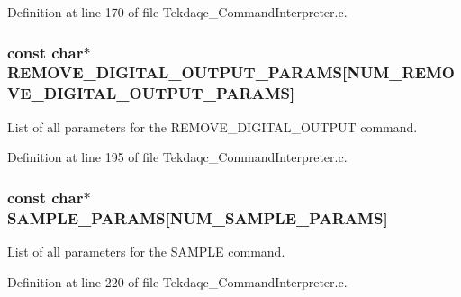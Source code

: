 Definition at line 170 of file Tekdaqc\-\_\-\-Command\-Interpreter.\-c.

\hypertarget{group__command__interpreter_gab8e88e0e75930f03474e1ff9e232ef63}{
\subsubsection[{R\-E\-M\-O\-V\-E\-\_\-\-D\-I\-G\-I\-T\-A\-L\-\_\-\-O\-U\-T\-P\-U\-T\-\_\-\-P\-A\-R\-A\-M\-S}]{\setlength{\rightskip}{0pt plus 5cm}const char$\ast$ R\-E\-M\-O\-V\-E\-\_\-\-D\-I\-G\-I\-T\-A\-L\-\_\-\-O\-U\-T\-P\-U\-T\-\_\-\-P\-A\-R\-A\-M\-S\mbox{[}{\bf N\-U\-M\-\_\-\-R\-E\-M\-O\-V\-E\-\_\-\-D\-I\-G\-I\-T\-A\-L\-\_\-\-O\-U\-T\-P\-U\-T\-\_\-\-P\-A\-R\-A\-M\-S}\mbox{]}}}\label{group__command__interpreter_gab8e88e0e75930f03474e1ff9e232ef63}
List of all parameters for the R\-E\-M\-O\-V\-E\-\_\-\-D\-I\-G\-I\-T\-A\-L\-\_\-\-O\-U\-T\-P\-U\-T command. 

Definition at line 195 of file Tekdaqc\-\_\-\-Command\-Interpreter.\-c.

\hypertarget{group__command__interpreter_ga7008aaf205ddd844e0a5affd12a08775}{
\subsubsection[{S\-A\-M\-P\-L\-E\-\_\-\-P\-A\-R\-A\-M\-S}]{\setlength{\rightskip}{0pt plus 5cm}const char$\ast$ S\-A\-M\-P\-L\-E\-\_\-\-P\-A\-R\-A\-M\-S\mbox{[}{\bf N\-U\-M\-\_\-\-S\-A\-M\-P\-L\-E\-\_\-\-P\-A\-R\-A\-M\-S}\mbox{]}}}\label{group__command__interpreter_ga7008aaf205ddd844e0a5affd12a08775}
List of all parameters for the S\-A\-M\-P\-L\-E command. 

Definition at line 220 of file Tekdaqc\-\_\-\-Command\-Interpreter.\-c.

